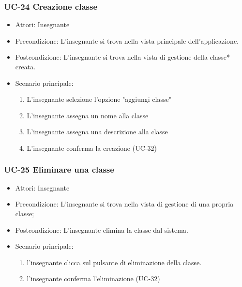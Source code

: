 \subsubsection{UC-24 Creazione classe}

\begin{itemize}
	\item Attori: Insegnante
	\item Precondizione: L'insegnante si trova nella vista principale dell'applicazione.
	\item Postcondizione: L'insegnante si trova nella vista di gestione della classe* creata.
	\item Scenario principale:
	\begin{enumerate}
		\item L'insegnante selezione l'opzione "aggiungi classe"
		\item L'insegnante assegna un nome alla classe
		\item L'insegnante assegna una descrizione alla classe
		\item L'insegnante conferma la creazione (UC-32)
	\end{enumerate}

\end{itemize}

\subsubsection{UC-25 Eliminare una classe}
\begin{itemize}
	\item Attori: Insegnante
	\item Precondizione: L'insegnante si trova nella vista di gestione di una propria classe;
	\item Postcondizione: L'insegnante elimina la classe dal sistema.
	\item Scenario principale:
	\begin{enumerate}
		\item l'insegnante clicca sul pulsante di eliminazione della classe.
		\item l'insegnante conferma l'eliminazione (UC-32)
	\end{enumerate}
\end{itemize}


